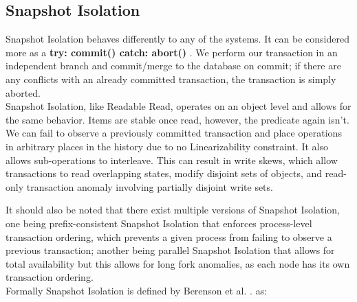 \documentclass[a4paper,10pt,titlepage]{report}
\begin{document}

\newpage
\subsection{Snapshot Isolation}

Snapshot Isolation behaves differently to any of the systems. It can be considered more as a \textbf{try: commit() catch: abort()} . We perform our transaction in an independent branch and commit/merge to the database on commit; if there are any conflicts with an already committed transaction, the transaction is simply aborted.
\\ \vspace{5mm}
Snapshot Isolation, like Readable Read, operates on an object level and allows for the same behavior. Items are stable once read, however, the predicate again isn't. We can fail to observe a previously committed transaction and place operations in arbitrary places in the history due to no Linearizability constraint. It also allows sub-operations to interleave. This can result in write skews, which allow transactions to read overlapping states, modify disjoint sets of objects, and read-only transaction anomaly involving partially disjoint write sets.
\\ \vspace{5mm}

It should also be noted that there exist multiple versions of Snapshot Isolation, one being prefix-consistent Snapshot Isolation that enforces process-level transaction ordering, which prevents a given process from failing to observe a previous transaction; another being parallel Snapshot Isolation that allows for total availability but this allows for long fork anomalies, as each node has its own transaction ordering.
\\ \vspace{5mm}
Formally Snapshot Isolation is defined by Berenson et al. \cite{Berensonetal}. as:
\end{document}
